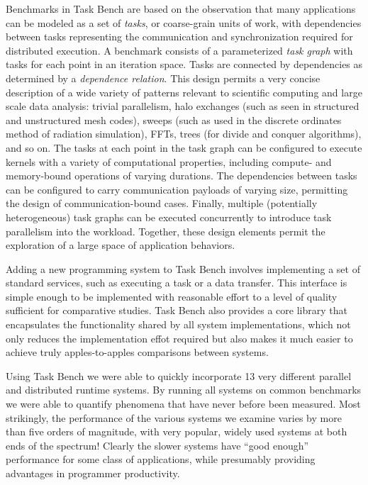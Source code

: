 Benchmarks in Task Bench are based on the observation that many applications can be modeled
as a set of \emph{tasks}, or coarse-grain units of work, with
dependencies between tasks representing the communication and synchronization required for
distributed execution. A benchmark consists of a parameterized \emph{task graph} with tasks for
each point in an iteration space. Tasks are connected by dependencies
as determined by a \emph{dependence relation}. This design permits a
very concise description of a wide variety of patterns relevant to
scientific computing and large scale data analysis: trivial parallelism, halo exchanges (such as
seen in structured and unstructured mesh codes), sweeps (such as used
in the discrete ordinates method of radiation simulation), FFTs, trees
(for divide and conquer algorithms), and so on. The tasks at each
point in the task graph can be configured to execute kernels with a
variety of computational properties, including compute- and
memory-bound operations of varying durations. The dependencies between
tasks can be configured to carry communication payloads of varying size, permitting
the design of communication-bound cases. Finally, multiple
(potentially heterogeneous) task graphs can be executed concurrently
to introduce task parallelism into the workload. Together, these
design elements permit the exploration of a large space of application
behaviors.

Adding a new programming system to Task Bench involves  implementing a set of standard
services, such as executing a task or a data transfer.  This interface is simple enough to 
be implemented with reasonable effort to a level of quality sufficient for comparative
studies. Task Bench also provides a core library that encapsulates the functionality
shared by all system implementations, which not only reduces the implementation effot
required but also makes it much easier to achieve truly apples-to-apples comparisons
between systems.

Using Task Bench we were able to quickly incorporate 13 very different parallel and distributed
runtime systems.  By running all systems on common benchmarks we were able to quantify phenomena
that have never before been measured.
Most strikingly, the performance of the various systems we examine varies by more than five orders
of magnitude, with very popular, widely used systems at both ends of the spectrum!  Clearly
the slower systems have ``good enough'' performance for some class of applications, while presumably
providing advantages in programmer productivity.

